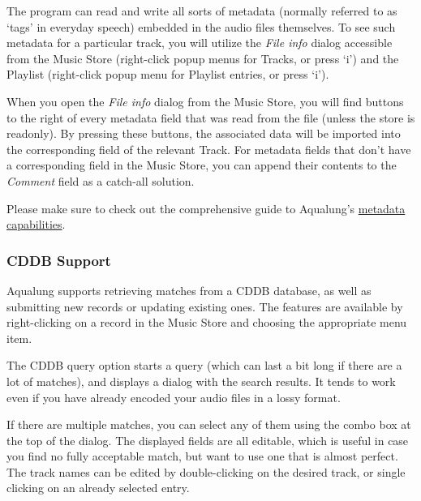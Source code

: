 \documentclass[10pt,english]{article}
\begin{document}
\noindent The program can read and write all sorts of metadata
(normally referred to as `tags' in everyday speech)
embedded in the audio files themselves. To see such metadata for
a particular track, you will utilize the \textsl{File info}
dialog accessible from the Music Store (right-click popup menus
for Tracks, or press `i') and the Playlist (right-click
popup menu for Playlist entries, or press `i').




When you open the \textsl{File info} dialog from the
Music Store, you will find buttons to the right of every
metadata field that was read from the file (unless the store
is readonly). By pressing these buttons, the associated data
will be imported into the corresponding field of the
relevant Track. For metadata fields that don't have a
corresponding field in the Music Store, you can append their
contents to the \textsl{Comment} field as a catch-all
solution.




Please make sure to check out the comprehensive guide to
Aqualung's \hyperref[idp695360]{\color{blue}metadata
capabilities}.




\subsubsection{CDDB Support\label{idp581984}}



\noindent Aqualung supports retrieving matches from a CDDB
database, as well as submitting new records or updating
existing ones. The features are available by right-clicking
on a record in the Music Store and choosing the appropriate
menu item.




The CDDB query option starts a query (which can last a
bit long if there are a lot of matches), and displays a
dialog with the search results. It tends to work even if you
have already encoded your audio files in a lossy format.




If there are multiple matches, you can select any of them
using the combo box at the top of the dialog. The displayed
fields are all editable, which is useful in case you find no
fully acceptable match, but want to use one that is almost
perfect. The track names can be edited by double-clicking on
the desired track, or single clicking on an already selected
entry.
\end{document}
